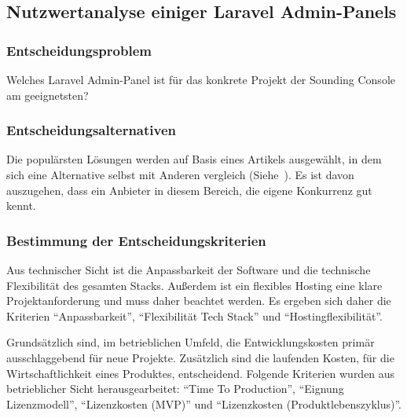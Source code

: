 \newpage

\subsection{Nutzwertanalyse einiger Laravel Admin-Panels}

\subsubsection{Entscheidungsproblem}
Welches Laravel Admin-Panel ist für das konkrete Projekt der Sounding Console am geeignetsten?

\subsubsection{Entscheidungsalternativen}
Die populärsten Lösungen werden auf Basis eines Artikels ausgewählt, in dem sich eine Alternative selbst mit Anderen vergleich (Siehe~\cite{the-guide-to-laravel-admin-panels}).
Es ist davon auszugehen, dass ein Anbieter in diesem Bereich, die eigene Konkurrenz gut kennt.

\subsubsection{Bestimmung der Entscheidungskriterien}
Aus technischer Sicht ist die Anpassbarkeit der Software und die technische Flexibilität des gesamten Stacks.
Außerdem ist ein flexibles Hosting eine klare Projektanforderung und muss daher beachtet werden.
Es ergeben sich daher die Kriterien \enquote{Anpassbarkeit}, \enquote {Flexibilität Tech Stack} und \enquote{Hostingflexibilität}.

Grundsätzlich sind, im betrieblichen Umfeld, die Entwicklungskosten primär ausschlaggebend für neue Projekte.
Zusätzlich sind die laufenden Kosten, für die Wirtschaftlichkeit eines Produktes, entscheidend.
Folgende Kriterien wurden aus betrieblicher Sicht herausgearbeitet: \enquote{Time To Production}, \enquote{Eignung Lizenzmodell}, \enquote{Lizenzkosten (MVP)} und \enquote{Lizenzkosten (Produktlebenszyklus)}.

